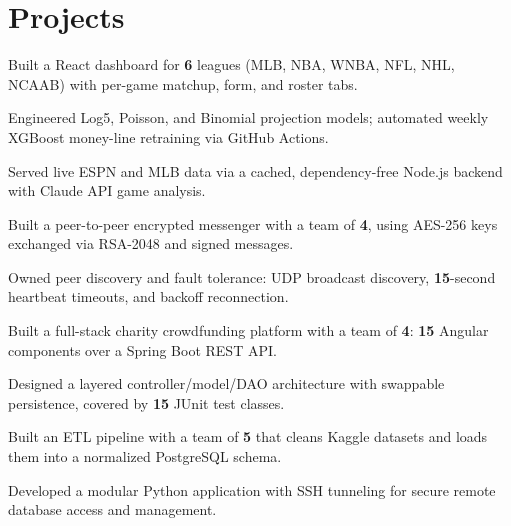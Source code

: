 \section{Projects}

\begin{highlights}
  \item Built a React dashboard for \textbf{6} leagues (MLB, NBA, WNBA, NFL, NHL, NCAAB) with per-game matchup, form, and roster tabs.
  \item Engineered Log5, Poisson, and Binomial projection models; automated weekly XGBoost money-line retraining via GitHub Actions.
  \item Served live ESPN and MLB data via a cached, dependency-free Node.js backend with Claude API game analysis.
\end{highlights}

\begin{highlights}
  \item Built a peer-to-peer encrypted messenger with a team of \textbf{4}, using AES-256 keys exchanged via RSA-2048 and signed messages.
  \item Owned peer discovery and fault tolerance: UDP broadcast discovery, \textbf{15}-second heartbeat timeouts, and backoff reconnection.
\end{highlights}

\begin{highlights}
  \item Built a full-stack charity crowdfunding platform with a team of \textbf{4}: \textbf{15} Angular components over a Spring Boot REST API.
  \item Designed a layered controller/model/DAO architecture with swappable persistence, covered by \textbf{15} JUnit test classes.
\end{highlights}

\begin{highlights}
  \item Built an ETL pipeline with a team of \textbf{5} that cleans Kaggle datasets and loads them into a normalized PostgreSQL schema.
  \item Developed a modular Python application with SSH tunneling for secure remote database access and management.
\end{highlights}

